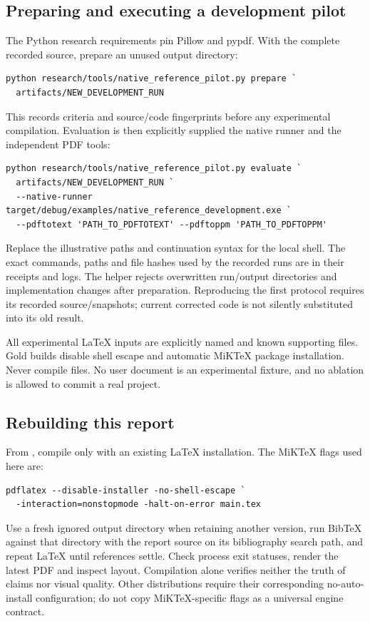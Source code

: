 \subsection{Preparing and executing a development pilot}
The Python research requirements pin Pillow and pypdf. With the complete
recorded source, prepare an unused output directory:
\begin{verbatim}
python research/tools/native_reference_pilot.py prepare `
  artifacts/NEW_DEVELOPMENT_RUN
\end{verbatim}
This records criteria and source/code fingerprints before any experimental
compilation. Evaluation is then explicitly supplied the native runner and
the independent PDF tools:
\begin{verbatim}
python research/tools/native_reference_pilot.py evaluate `
  artifacts/NEW_DEVELOPMENT_RUN `
  --native-runner target/debug/examples/native_reference_development.exe `
  --pdftotext 'PATH_TO_PDFTOTEXT' --pdftoppm 'PATH_TO_PDFTOPPM'
\end{verbatim}
Replace the illustrative paths and continuation syntax for the local shell.
The exact commands, paths and file hashes used by the recorded runs are in
their receipts and logs. The helper rejects overwritten run/output directories
and implementation changes after preparation. Reproducing the first protocol
requires its recorded source/snapshots; current corrected code is not silently
substituted into its old result.

All experimental LaTeX inputs are explicitly named  and known
supporting  files. Gold builds disable shell escape and automatic
MiKTeX package installation. Never compile  files. No user document
is an experimental fixture, and no ablation is allowed to commit a real project.

\subsection{Rebuilding this report}
From , compile only  with an existing
LaTeX installation. The MiKTeX flags used here are:
\begin{verbatim}
pdflatex --disable-installer -no-shell-escape `
  -interaction=nonstopmode -halt-on-error main.tex
\end{verbatim}
Use a fresh ignored output directory when retaining another version, run
BibTeX against that directory with the report source on its bibliography search
path, and repeat LaTeX until references settle. Check process exit statuses,
render the latest PDF and inspect layout. Compilation alone verifies neither
the truth of claims nor visual quality. Other distributions require their
corresponding no-auto-install configuration; do not copy MiKTeX-specific flags
as a universal engine contract.

